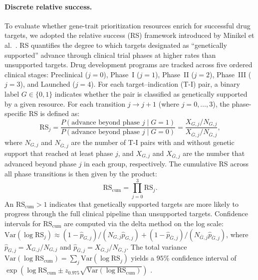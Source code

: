 \paragraph{Discrete relative success.}
To evaluate whether gene-trait prioritization resources enrich for successful drug targets, we adopted the relative success (RS) framework introduced by Minikel et al.\ \cite{minikel_refining_2024}. RS quantifies the degree to which targets designated as ``genetically supported'' advance through clinical trial phases at higher rates than unsupported targets. Drug development programs are tracked across five ordered clinical stages: Preclinical ($j{=}0$), Phase~I ($j{=}1$), Phase~II ($j{=}2$), Phase~III ($j{=}3$), and Launched ($j{=}4$). For each target--indication (T-I) pair, a binary label $G \in \{0,1\}$ indicates whether the pair is classified as genetically supported by a given resource. For each transition $j \to j{+}1$ (where $j = 0, \ldots, 3$), the phase-specific RS is defined as:
\begin{equation}\label{eq:rs-phase}
    \text{RS}_j = \frac{P(\text{advance beyond phase } j \mid G=1)}{P(\text{advance beyond phase } j \mid G=0)} = \frac{X_{G,j} / N_{G,j}}{X_{\bar{G},j} / N_{\bar{G},j}},
\end{equation}
where $N_{G,j}$ and $N_{\bar{G},j}$ are the number of T-I pairs with and without genetic support that reached at least phase $j$, and $X_{G,j}$ and $X_{\bar{G},j}$ are the number that advanced beyond phase $j$ in each group, respectively. The cumulative RS across all phase transitions is then given by the product:
\begin{equation}\label{eq:rs-cum}
    \text{RS}_{\text{cum}} = \prod_{j=0}^{3} \text{RS}_j.
\end{equation}
An $\text{RS}_{\text{cum}} > 1$ indicates that genetically supported targets are more likely to progress through the full clinical pipeline than unsupported targets. Confidence intervals for $\text{RS}_{\text{cum}}$ are computed via the delta method on the log scale: $\text{Var}(\log \text{RS}_j) \approx (1-\hat{p}_{G,j})/(N_{G,j}\hat{p}_{G,j}) + (1-\hat{p}_{\bar{G},j})/(N_{\bar{G},j}\hat{p}_{\bar{G},j})$, where $\hat{p}_{G,j} = X_{G,j}/N_{G,j}$ and $\hat{p}_{\bar{G},j} = X_{\bar{G},j}/N_{\bar{G},j}$. The total variance $\text{Var}(\log \text{RS}_{\text{cum}}) = \sum_j \text{Var}(\log \text{RS}_j)$ yields a $95\%$ confidence interval of $\exp(\log \text{RS}_{\text{cum}} \pm z_{0.975}\sqrt{\text{Var}(\log \text{RS}_{\text{cum}})})$ \cite{minikel_refining_2024}.

